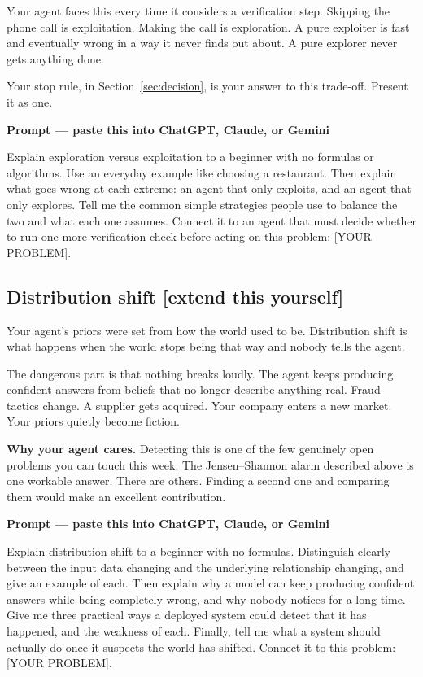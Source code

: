 \documentclass[11pt,a4paper]{article}
\newcommand{\boxtitle}[1]{{\bfseries #1}\par\vspace{2pt}}
\newcommand{\extend}{\hfill{\footnotesize\sffamily\color{sbaccent}[extend this yourself]}}
\newenvironment{learnprompt}
  {\begin{sbbox}\boxtitle{Prompt --- paste this into ChatGPT, Claude, or Gemini}%
   \ttfamily\small\raggedright}
  {\end{sbbox}}
\begin{document}
Your agent faces this every time it considers a verification step. Skipping the phone call is
exploitation. Making the call is exploration. A pure exploiter is fast and eventually wrong in a
way it never finds out about. A pure explorer never gets anything done.

Your stop rule, in Section~\ref{sec:decision}, is your answer to this trade-off. Present it as
one.

\begin{learnprompt}
Explain exploration versus exploitation to a beginner with no formulas or algorithms. Use an
everyday example like choosing a restaurant. Then explain what goes wrong at each extreme: an
agent that only exploits, and an agent that only explores. Tell me the common simple strategies
people use to balance the two and what each one assumes. Connect it to an agent that must decide
whether to run one more verification check before acting on this problem: [YOUR PROBLEM].
\end{learnprompt}

\subsection{Distribution shift \extend}

Your agent's priors were set from how the world used to be. Distribution shift is what happens
when the world stops being that way and nobody tells the agent.

The dangerous part is that nothing breaks loudly. The agent keeps producing confident answers
from beliefs that no longer describe anything real. Fraud tactics change. A supplier gets
acquired. Your company enters a new market. Your priors quietly become fiction.

\textbf{Why your agent cares.} Detecting this is one of the few genuinely open problems you can
touch this week. The Jensen--Shannon alarm described above is one workable answer. There are
others. Finding a second one and comparing them would make an excellent contribution.

\begin{learnprompt}
Explain distribution shift to a beginner with no formulas. Distinguish clearly between the input
data changing and the underlying relationship changing, and give an example of each. Then explain
why a model can keep producing confident answers while being completely wrong, and why nobody
notices for a long time. Give me three practical ways a deployed system could detect that it has
happened, and the weakness of each. Finally, tell me what a system should actually do once it
suspects the world has shifted. Connect it to this problem: [YOUR PROBLEM].
\end{learnprompt}
\end{document}
